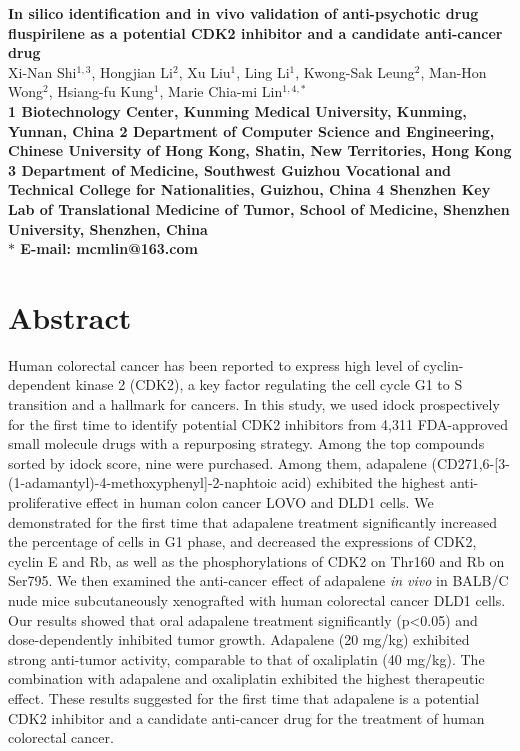\documentclass[10pt]{article}
\date{}
\begin{document}
\begin{flushleft}
{\Large
\textbf{In silico identification and in vivo validation of anti-psychotic drug fluspirilene as a potential CDK2 inhibitor and a candidate anti-cancer drug}
}
\\
Xi-Nan Shi$^{1,3}$,
Hongjian Li$^{2}$,
Xu Liu$^{1}$,
Ling Li$^{1}$,
Kwong-Sak Leung$^{2}$,
Man-Hon Wong$^{2}$,
Hsiang-fu Kung$^{1}$,
Marie Chia-mi Lin$^{1,4,\ast}$
\\
\bf{1} Biotechnology Center, Kunming Medical University, Kunming, Yunnan, China
\bf{2} Department of Computer Science and Engineering, Chinese University of Hong Kong, Shatin, New Territories, Hong Kong
\bf{3} Department of Medicine, Southwest Guizhou Vocational and Technical College for Nationalities, Guizhou, China
\bf{4} Shenzhen Key Lab of Translational Medicine of Tumor, School of Medicine, Shenzhen University, Shenzhen, China
\\
$\ast$ E-mail: mcmlin@163.com
\end{flushleft}

\section*{Abstract}
Human colorectal cancer has been reported to express high level of cyclin-dependent kinase 2 (CDK2), a key factor regulating the cell cycle G1 to S transition and a hallmark for cancers. In this study, we used idock prospectively for the first time to identify potential CDK2 inhibitors from 4,311 FDA-approved small molecule drugs with a repurposing strategy. Among the top compounds sorted by idock score, nine were purchased. Among them, adapalene (CD271,6-[3-(1-adamantyl)-4-methoxyphenyl]-2-naphtoic acid) exhibited the highest anti-proliferative effect in human colon cancer LOVO and DLD1 cells. We demonstrated for the first time that adapalene treatment significantly increased the percentage of cells in G1 phase, and decreased the expressions of CDK2, cyclin E and Rb, as well as the phosphorylations of CDK2 on Thr160 and Rb on Ser795. We then examined the anti-cancer effect of adapalene \textit{in vivo} in BALB/C nude mice subcutaneously xenografted with human colorectal cancer DLD1 cells. Our results showed that oral adapalene treatment significantly (p<0.05) and dose-dependently inhibited tumor growth. Adapalene (20 mg/kg) exhibited strong anti-tumor activity, comparable to that of oxaliplatin (40 mg/kg). The combination with adapalene and oxaliplatin exhibited the highest therapeutic effect. These results suggested for the first time that adapalene is a potential CDK2 inhibitor and a candidate anti-cancer drug for the treatment of human colorectal cancer.
\end{document}
